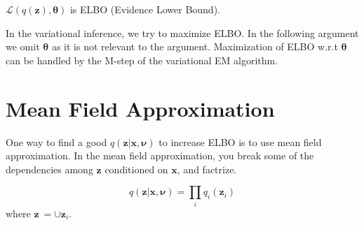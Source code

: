\documentclass[a4]{article}
\begin{document}
$\mathcal{L}(q(\mathbf{z}), \bm{\theta})$ is ELBO (Evidence Lower Bound).

In the variational inference, we try to maximize ELBO.
In the following argument we omit $\bm{\theta}$ as it is not relevant to the argument.
Maximization of ELBO w.r.t $\bm{\theta}$ can be handled by the M-step of the variational EM algorithm.

\section{Mean Field Approximation}
One way to find a good $q(\mathbf{z}|\mathbf{x}, \bm{\nu})$ to increase ELBO is to use mean field approximation.
In the mean field approximation, you break some of the dependencies among $\mathbf{z}$ conditioned on $\mathbf{x}$, and factrize.

\begin{equation}
q(\mathbf{z}|\mathbf{x}, \bm{\nu}) =  \prod_i q_i ( \mathbf{z}_i)
\end{equation}
where $\mathbf{z} \:= \cup \mathbf{z}_{i}$.
\end{document}

